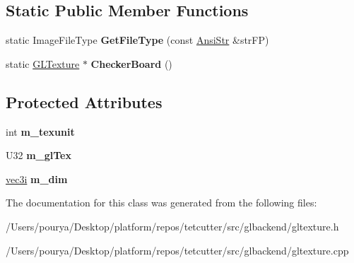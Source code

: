 \subsection*{Static Public Member Functions}
\begin{DoxyCompactItemize}
\item 
\hypertarget{classps_1_1opengl_1_1GLTexture_acfdb5ccaaae35d7181f2e02ad2ce334f}{}static Image\+File\+Type {\bfseries Get\+File\+Type} (const \hyperlink{classps_1_1base_1_1CAString}{Ansi\+Str} \&str\+F\+P)\label{classps_1_1opengl_1_1GLTexture_acfdb5ccaaae35d7181f2e02ad2ce334f}

\item 
\hypertarget{classps_1_1opengl_1_1GLTexture_a1acd6723be6c74830c1f421c18fe7ef7}{}static \hyperlink{classps_1_1opengl_1_1GLTexture}{G\+L\+Texture} $\ast$ {\bfseries Checker\+Board} ()\label{classps_1_1opengl_1_1GLTexture_a1acd6723be6c74830c1f421c18fe7ef7}

\end{DoxyCompactItemize}
\subsection*{Protected Attributes}
\begin{DoxyCompactItemize}
\item 
\hypertarget{classps_1_1opengl_1_1GLTexture_a4f182a1756309ca8a54014c2af1dde48}{}int {\bfseries m\+\_\+texunit}\label{classps_1_1opengl_1_1GLTexture_a4f182a1756309ca8a54014c2af1dde48}

\item 
\hypertarget{classps_1_1opengl_1_1GLTexture_a906c159323b7f804f153ddc81484479c}{}U32 {\bfseries m\+\_\+gl\+Tex}\label{classps_1_1opengl_1_1GLTexture_a906c159323b7f804f153ddc81484479c}

\item 
\hypertarget{classps_1_1opengl_1_1GLTexture_a638777de5607b5f8d65d06a2a57eb1a4}{}\hyperlink{classps_1_1base_1_1Vec3}{vec3i} {\bfseries m\+\_\+dim}\label{classps_1_1opengl_1_1GLTexture_a638777de5607b5f8d65d06a2a57eb1a4}

\end{DoxyCompactItemize}


The documentation for this class was generated from the following files\+:\begin{DoxyCompactItemize}
\item 
/\+Users/pourya/\+Desktop/platform/repos/tetcutter/src/glbackend/gltexture.\+h\item 
/\+Users/pourya/\+Desktop/platform/repos/tetcutter/src/glbackend/gltexture.\+cpp\end{DoxyCompactItemize}
